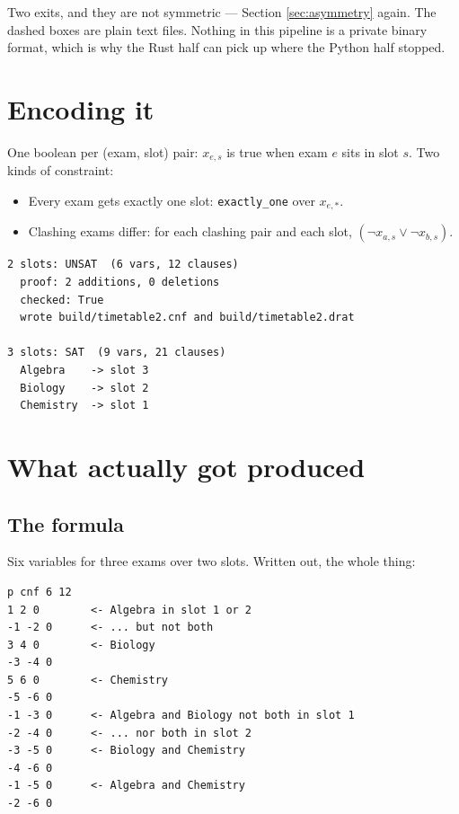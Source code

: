 \documentclass[11pt,a4paper]{article}
\begin{document}
Two exits, and they are not symmetric --- Section \ref{sec:asymmetry} again.
The dashed boxes are plain text files. Nothing in this pipeline is a private
binary format, which is why the Rust half can pick up where the Python half
stopped.

\section{Encoding it}

One boolean per (exam, slot) pair: $x_{e,s}$ is true when exam $e$ sits in slot
$s$. Two kinds of constraint:

\begin{itemize}
\item Every exam gets exactly one slot: \texttt{exactly\_one} over $x_{e,\ast}$.
\item Clashing exams differ: for each clashing pair and each slot,
      $(\lnot x_{a,s} \lor \lnot x_{b,s})$.
\end{itemize}



\begin{lstlisting}[style=out]
2 slots: UNSAT  (6 vars, 12 clauses)
  proof: 2 additions, 0 deletions
  checked: True
  wrote build/timetable2.cnf and build/timetable2.drat

3 slots: SAT  (9 vars, 21 clauses)
  Algebra    -> slot 3
  Biology    -> slot 2
  Chemistry  -> slot 1
\end{lstlisting}

\section{What actually got produced}

\subsection*{The formula}

Six variables for three exams over two slots. Written out, the whole thing:

\begin{lstlisting}[style=out]
p cnf 6 12
1 2 0        <- Algebra in slot 1 or 2
-1 -2 0      <- ... but not both
3 4 0        <- Biology
-3 -4 0
5 6 0        <- Chemistry
-5 -6 0
-1 -3 0      <- Algebra and Biology not both in slot 1
-2 -4 0      <- ... nor both in slot 2
-3 -5 0      <- Biology and Chemistry
-4 -6 0
-1 -5 0      <- Algebra and Chemistry
-2 -6 0
\end{lstlisting}
\end{document}
